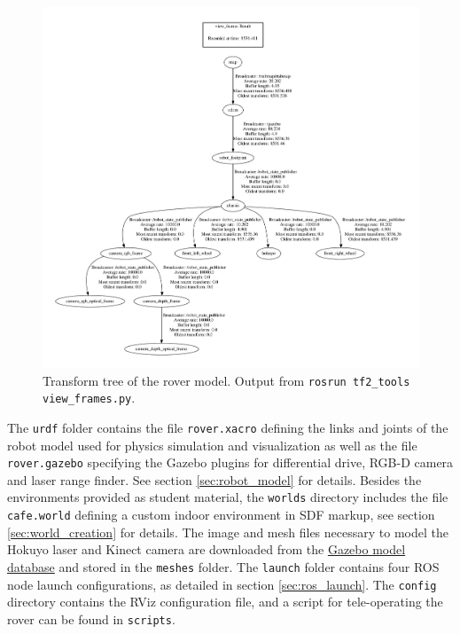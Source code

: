 \documentclass[10pt, journal, compsoc]{IEEEtran}
\begin{document}
\begin{figure}[thpb]
      \centering
      \includegraphics[width=\textwidth]{images/frames.pdf}
      \caption{Transform tree of the rover model. Output from \texttt{rosrun tf2\_tools view\_frames.py}.}
      \label{fig:rover_tf_tree}
\end{figure}

The \texttt{urdf} folder contains the file \texttt{rover.xacro} defining the links and joints of the robot model used for physics simulation and visualization as well as the file \texttt{rover.gazebo} specifying the Gazebo plugins for differential drive, RGB-D camera and laser range finder. See section \ref{sec:robot_model} for details. Besides the environments provided as student material, the \texttt{worlds} directory includes the file \texttt{cafe.world} defining a custom indoor environment in SDF markup, see section \ref{sec:world_creation} for details. The image and mesh files necessary to model the Hokuyo laser and Kinect camera are downloaded from the \href{https://bitbucket.org/osrf/gazebo_models/downloads/}{Gazebo model database} and stored in the \texttt{meshes} folder. The \texttt{launch} folder contains four ROS node launch configurations, as detailed in section  \ref{sec:ros_launch}. The \texttt{config} directory contains the RViz configuration file, and a script for tele-operating the rover can be found in \texttt{scripts}. 
\end{document}
